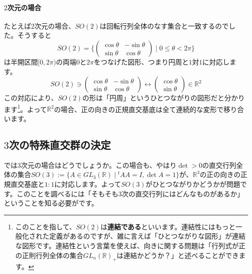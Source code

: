 \paragraph{$2$次元の場合}

たとえば$2$次元の場合、$SO(2)$は回転行列全体のなす集合と一致するのでした。そうすると
\[
SO(2) = 
\biggl\{
\begin{pmatrix}
\cos \theta & -\sin \theta \\
\sin \theta & \cos \theta
\end{pmatrix}
\mid 0 \leq \theta < 2\pi
\biggr\}
\]
は半開区間$[0, 2\pi)$の両端$0$と$2\pi$をつなげた図形、つまり円周と$1$対$1$に対応します。
\[
SO(2) \ni
\begin{pmatrix}
\cos \theta & -\sin \theta \\
\sin \theta & \cos \theta
\end{pmatrix}
\longleftrightarrow
\begin{pmatrix}
\cos \theta \\
\sin \theta
\end{pmatrix}
\in \mathbb{R}^2
\]
この対応により、$SO(2)$の形は「円周」というひとつながりの図形だと分かります\footnote{このことを指して、$SO(2)$は\textbf{連結である}といいます。連結性にはもっと一般化された定義があるのですが、雑に言えば「ひとつながりな図形」が連結な図形です。連結性という言葉を使えば、向きに関する問題は「行列式が正の正則行列全体の集合$GL_n(\mathbb{R})_+$は連結かどうか？」と述べることができます。}。よって$\mathbb{R}^2$の場合、正の向きの正規直交基底は全て連続的な変形で移り合います。

\subsection{$3$次の特殊直交群の決定}

では$3$次元の場合はどうでしょうか。この場合も、やはり$\det > 0$の直交行列全体の集合$SO(3) := \{ A \in GL_3(\mathbb{R}) \mid {}^t\!A A = I, \det A = 1\}$が、$\mathbb{R}^3$の正の向きの正規直交基底と$1:1$に対応します。よって$SO(3)$がひとつながりかどうかが問題です。このことを調べるには「そもそも$3$次の直交行列にはどんなものがあるか」ということを知る必要がです。

